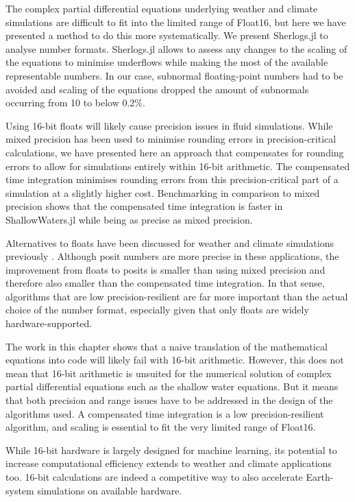 The complex partial differential equations underlying weather and climate simulations are difficult to fit into the
limited range of Float16, but here we have presented a method to do this more systematically. We present 
Sherlogs.jl to analyse number formats. Sherlogs.jl allows to assess any changes to the scaling of the equations
to minimise underflows while making the most of the available representable numbers. In our case,
subnormal floating-point numbers had to be avoided and scaling of the equations dropped the amount of
subnormals occurring from 10 to below 0.2\%.

Using 16-bit floats will likely cause precision issues in fluid simulations. While mixed precision has been
used to minimise rounding errors in precision-critical calculations, we have presented here an approach
that compensates for rounding errors to allow for simulations entirely within 16-bit arithmetic.
The compensated time integration minimises rounding errors from this precision-critical part of a simulation
at a slightly higher cost. Benchmarking in comparison to mixed precision shows that the compensated
time integration is faster in ShallowWaters.jl while being as precise as mixed precision.

Alternatives to floats have been discussed for weather and climate simulations previously \citep{Klower2019a,Klower2020a}.
Although posit numbers \citep{Gustafson2017a} are more precise in these applications, the improvement from floats to
posits is smaller than using mixed precision and therefore also smaller than the compensated time integration.
In that sense, algorithms that are low precision-resilient are far more important than the actual choice of the
number format, especially given that only floats are widely hardware-supported.

The work in this chapter shows that a naive translation of the mathematical equations into code will likely fail with 16-bit arithmetic.
However, this does not mean that 16-bit arithmetic is unsuited for the numerical solution of complex partial differential
equations such as the shallow water equations. But it means that both precision and range issues have to be addressed
in the design of the algorithms used. A compensated time integration is a low precision-resilient algorithm,
and scaling is essential to fit the very limited range of Float16. 

While 16-bit hardware is largely designed for machine learning, its potential to increase computational efficiency
extends to weather and climate applications too. 16-bit calculations are indeed a competitive way to also accelerate
Earth-system simulations on available hardware.


